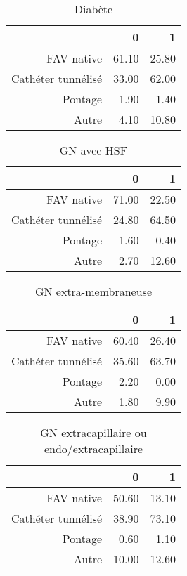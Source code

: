 \documentclass[11pt,a4paper]{article}\usepackage[]{graphicx}\usepackage[]{color}
\begin{document}
\begin{table}[H]
\centering
\begin{tabular}{rrr}
  \hline
 & 0 & 1 \\ 
  \hline
FAV native & 61.10 & 25.80 \\ 
  Cathéter tunnélisé & 33.00 & 62.00 \\ 
  Pontage & 1.90 & 1.40 \\ 
  Autre & 4.10 & 10.80 \\ 
   \hline
\end{tabular}
\caption{Diabète} 
\end{table}
\begin{table}[H]
\centering
\begin{tabular}{rrr}
  \hline
 & 0 & 1 \\ 
  \hline
FAV native & 71.00 & 22.50 \\ 
  Cathéter tunnélisé & 24.80 & 64.50 \\ 
  Pontage & 1.60 & 0.40 \\ 
  Autre & 2.70 & 12.60 \\ 
   \hline
\end{tabular}
\caption{GN avec HSF} 
\end{table}
\begin{table}[H]
\centering
\begin{tabular}{rrr}
  \hline
 & 0 & 1 \\ 
  \hline
FAV native & 60.40 & 26.40 \\ 
  Cathéter tunnélisé & 35.60 & 63.70 \\ 
  Pontage & 2.20 & 0.00 \\ 
  Autre & 1.80 & 9.90 \\ 
   \hline
\end{tabular}
\caption{GN extra-membraneuse} 
\end{table}
\begin{table}[H]
\centering
\begin{tabular}{rrr}
  \hline
 & 0 & 1 \\ 
  \hline
FAV native & 50.60 & 13.10 \\ 
  Cathéter tunnélisé & 38.90 & 73.10 \\ 
  Pontage & 0.60 & 1.10 \\ 
  Autre & 10.00 & 12.60 \\ 
   \hline
\end{tabular}
\caption{GN extracapillaire ou endo/extracapillaire} 
\end{table}
\end{document}
